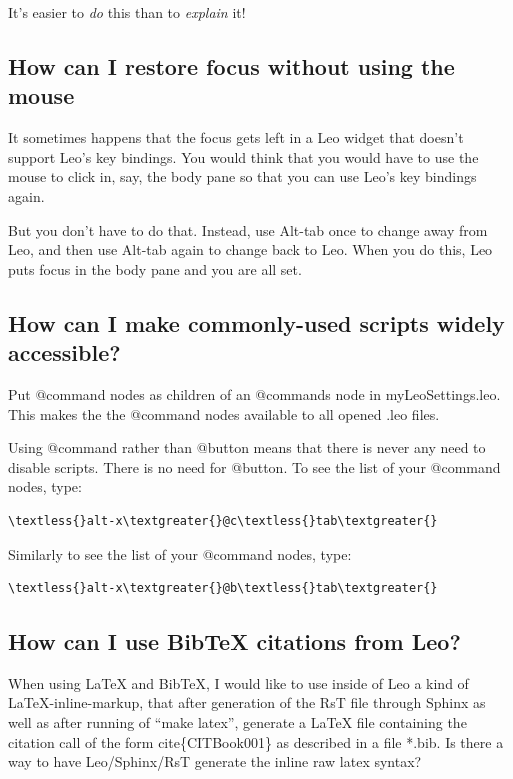 \documentclass[a4paper,10pt,english]{sphinxmanual}
\begin{document}
It's easier to \emph{do} this than to \emph{explain} it!


\subsection{How can I restore focus without using the mouse}
\label{FAQ:how-can-i-restore-focus-without-using-the-mouse}
It sometimes happens that the focus gets left in a Leo
widget that doesn't support Leo's key bindings. You would
think that you would have to use the mouse to click in, say,
the body pane so that you can use Leo's key bindings again.

But you don't have to do that.  Instead, use Alt-tab once to change
away from Leo, and then use Alt-tab again to change back to Leo.  When
you do this, Leo puts focus in the body pane and you are all set.


\subsection{How can I make commonly-used scripts widely accessible?}
\label{FAQ:how-can-i-make-commonly-used-scripts-widely-accessible}
Put @command nodes as children of an @commands node in myLeoSettings.leo.
This makes the the @command nodes available to all opened .leo files.

Using @command rather than @button means that there is never any need to
disable scripts. There is no need for @button. To see the list of your
@command nodes, type:

\begin{Verbatim}[commandchars=\\\{\}]
\textless{}alt-x\textgreater{}@c\textless{}tab\textgreater{}
\end{Verbatim}

Similarly to see the list of your @command nodes, type:

\begin{Verbatim}[commandchars=\\\{\}]
\textless{}alt-x\textgreater{}@b\textless{}tab\textgreater{}
\end{Verbatim}


\subsection{How can I use BibTeX citations from Leo?}
\label{FAQ:how-can-i-use-bibtex-citations-from-leo}
When using LaTeX and BibTeX, I would like to use inside of Leo a kind of
LaTeX-inline-markup, that after generation of the RsT file through Sphinx
as well as after running of ``make latex'', generate a LaTeX file containing
the citation call of the form cite\{CITBook001\} as described in a file
*.bib. Is there a way to have Leo/Sphinx/RsT generate the inline raw latex
syntax?
\end{document}

